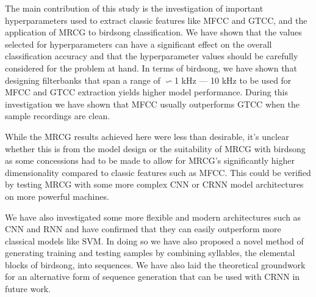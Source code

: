 The main contribution of this study is the investigation of important
hyperparameters used to extract classic features like MFCC and GTCC, and the
application of MRCG to birdsong classification. We have shown that the values
selected for hyperparameters can have a significant effect on the overall
classification accuracy and that the hyperparameter values should be carefully
considered for the problem at hand. In terms of birdsong, we have shown that
designing filterbanks that span a range of $\backsim$1 kHz --- 10 kHz to be
used for MFCC and GTCC extraction yields higher model performance. During this
investigation we have shown that MFCC usually outperforms GTCC when the sample
recordings are clean.

While the MRCG results achieved here were less than desirable, it's unclear
whether this is from the model design or the suitability of MRCG with birdsong
as some concessions had to be made to allow for MRCG's significantly higher
dimensionality compared to classic features such as MFCC\@. This could be
verified by testing MRCG with some more complex CNN or CRNN model architectures
on more powerful machines.

We have also investigated some more flexible and modern architectures such as CNN
and RNN and have confirmed that they can easily outperform more classical models
like SVM\@. In doing so we have also proposed a novel method of generating
training and testing samples by combining syllables, the elemental blocks of
birdsong, into sequences. We have also laid the theoretical groundwork for an
alternative form of sequence generation that can be used with CRNN in future work.
